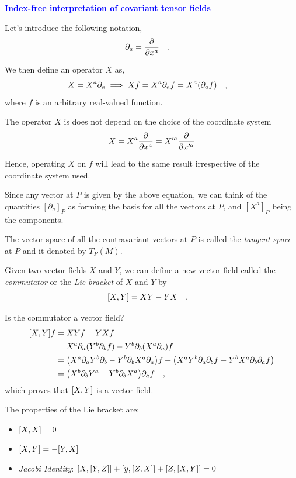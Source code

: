 \documentclass[landscape,aspectratio=169]{slides}
\begin{document}
\begin{slide}
	\textcolor{blue}{\textbf{Index-free interpretation of covariant tensor fields}}
	
	Let's introduce the following notation,
	\begin{equation}\label{key}
	\partial_a = \pdv{x^a} \qq{.}
	\end{equation}
	
	We then define an operator $ X $ as,
	\begin{equation}\label{key}
	X = X^a \partial_a \implies Xf = X^a \partial_a f = X^a (\partial_a f) \qq{,}
	\end{equation}
	where $ f $ is an arbitrary real-valued function. 
\end{slide}	

\begin{slide}
	The operator $ X $ is does not depend on the choice of the coordinate system $$ X = X^a \pdv{x^a} =X'^a \pdv{x'^a}  $$	
	
	Hence, operating $ X $ on $ f $ will lead to the same result irrespective of the coordinate system used.
	
	Since any vector at $ P $ is given by the above equation, we can think of the quantities $ [\partial_a]_P $ as forming the basis for all the vectors at $ P $, and $ [X^a]_P $ being the components.
	
	The vector space of all the contravariant vectors at $ P $ is called the \textit{tangent space} at $ P $ and it denoted by $T_P(M)$.
\end{slide}

\begin{slide}
	Given two vector fields $ X $ and $ Y $, we can define a new vector field called the \textit{commutator} or the \textit{Lie bracket} of $ X $ and $ Y $ by
	\begin{equation}\label{key}
	\qty[X, Y] = XY - YX \qq{.}
	\end{equation}
	
	Is the commutator a vector field?
	\begin{align*}
	\qty[X, Y] f &= XYf - YXf \\
	&= X^a \partial_a ( Y^b \partial_b f  ) - Y^b \partial_b (X^a \partial_a ) f \\
	&=\qty(X^a \partial_a Y^b \partial_b    - Y^b \partial_b X^a \partial_a ) f  + \qty(X^a Y^b \partial_a  \partial_b f - Y^b X^a \partial_b \partial_a f) \\
	& = \qty(X^b \partial_b Y^a     - Y^b \partial_b X^a ) \partial_a f \qq{,} 
	\end{align*}
	which proves that $ \qty[X,Y] $ is a vector field.
\end{slide}
\begin{slide}	
	The properties of the Lie bracket are:
	\begin{itemize}
		\item  $ \qty[X,X] = 0 $
		\item $ \comm{X}{Y} = - \comm{Y}{X} $
		\item \textit{Jacobi Identity}: $ \comm{X}{\comm{Y}{Z}} + \comm{y}{\comm{Z}{X}} + \comm{Z}{\comm{X}{Y}} = 0 $
	\end{itemize}
\end{slide}
\end{document}
